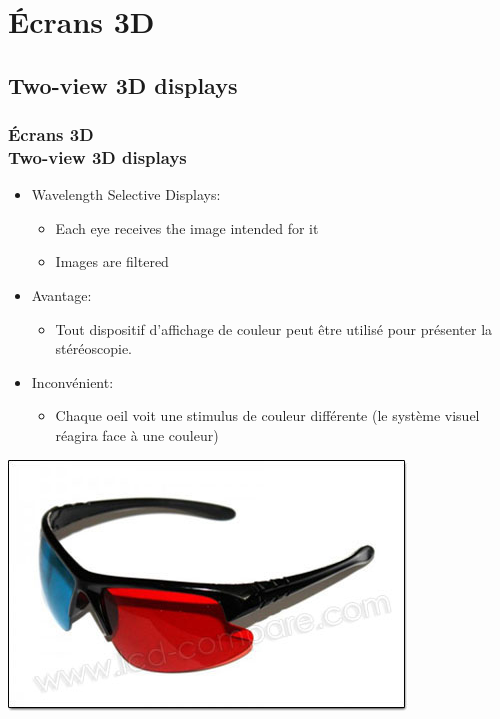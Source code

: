 
\section{Écrans 3D}
\subsection{Two-view 3D displays}
\begin{frame}

  \frametitle{Écrans 3D \\Two-view 3D displays} 
  
  \begin{itemize}
  \item Wavelength Selective Displays:
    
    \begin{itemize}
    \item Each eye receives the image intended for it
    \item Images are filtered	
    \end{itemize}
    
    
    
  \item Avantage:
    \begin{itemize} 	
    \item Tout dispositif d'affichage de couleur peut être utilisé pour présenter la stéréoscopie.
    \end{itemize}
  \item Inconvénient:
    \begin{itemize} 
    \item Chaque oeil voit une stimulus de couleur différente (le système visuel réagira face à une couleur)
    \end{itemize}
  \end{itemize}
  \includegraphics[keepaspectratio,height=.13\linewidth]{1.jpg}
\end{frame}


